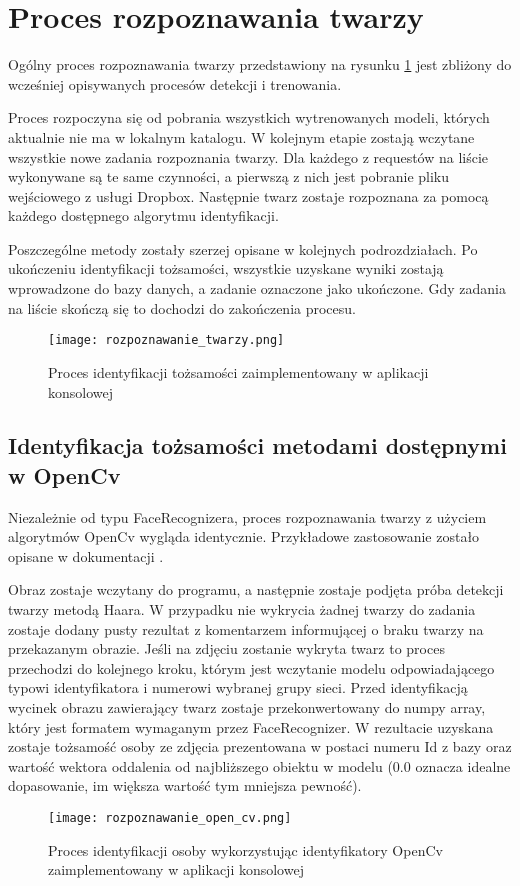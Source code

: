 \section{Proces rozpoznawania twarzy}\label{s:proces_rozpoznawania}
Ogólny proces rozpoznawania twarzy przedstawiony na rysunku \ref{fig:rozpoznawanie_proces} jest zbliżony do wcześniej opisywanych procesów detekcji i trenowania. 

Proces rozpoczyna się od pobrania wszystkich wytrenowanych modeli, których aktualnie nie ma w lokalnym katalogu. W kolejnym etapie zostają wczytane wszystkie nowe zadania rozpoznania twarzy. Dla każdego z requestów na liście wykonywane są te same czynności, a pierwszą z nich jest pobranie pliku wejściowego z usługi Dropbox. Następnie twarz zostaje rozpoznana za pomocą każdego dostępnego algorytmu identyfikacji. 

Poszczególne metody zostały szerzej opisane w kolejnych podrozdziałach. Po ukończeniu identyfikacji tożsamości, wszystkie uzyskane wyniki zostają wprowadzone do bazy danych, a zadanie oznaczone jako ukończone. Gdy zadania na liście skończą się to dochodzi do zakończenia procesu.
\begin{figure}[H]
	\centering
	\texttt{[image: rozpoznawanie\_twarzy.png]}
	\caption{Proces identyfikacji tożsamości zaimplementowany w aplikacji konsolowej}
	\label{fig:rozpoznawanie_proces}
\end{figure}

\subsection{Identyfikacja tożsamości metodami dostępnymi w OpenCv}
Niezależnie od typu FaceRecognizera, proces rozpoznawania twarzy z użyciem algorytmów OpenCv wygląda identycznie. Przykładowe zastosowanie zostało opisane w dokumentacji \cite{opencv_doc}. 

Obraz zostaje wczytany do programu, a następnie zostaje podjęta próba detekcji twarzy metodą Haara. W przypadku nie wykrycia żadnej twarzy do zadania zostaje dodany pusty rezultat z komentarzem informującej o braku twarzy na przekazanym obrazie. 
Jeśli na zdjęciu zostanie wykryta twarz to proces przechodzi do kolejnego kroku, którym jest wczytanie modelu odpowiadającego typowi identyfikatora i numerowi wybranej grupy sieci. Przed identyfikacją wycinek obrazu zawierający twarz zostaje przekonwertowany do numpy array, który jest formatem wymaganym przez FaceRecognizer. W rezultacie uzyskana zostaje tożsamość osoby ze zdjęcia prezentowana w postaci numeru Id z bazy oraz wartość wektora oddalenia od najbliższego obiektu w modelu (0.0 oznacza idealne dopasowanie, im większa wartość tym mniejsza pewność). 
\begin{figure}[H]
	\centering
	\texttt{[image: rozpoznawanie\_open\_cv.png]}
	\caption{Proces identyfikacji osoby wykorzystując identyfikatory OpenCv zaimplementowany w aplikacji konsolowej}
	\label{fig:rozpoznawanie_open_cv}
\end{figure}

